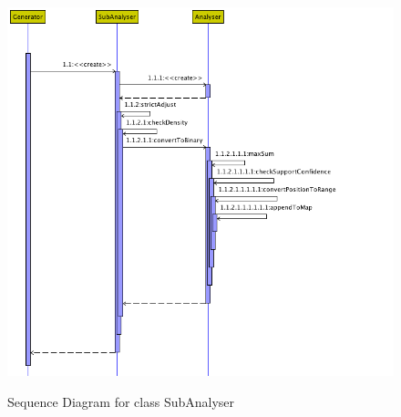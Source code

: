 \begin{description}
\begin{figure}[ht]
    \centering
    \includegraphics[width=5in, height=4.5in]{figures/sequence_subanalyser}
    \caption[Sequence Diagram for class SubAnalyser]{Sequence Diagram for class SubAnalyser}
    \label{fig:figure4_52}
\end{figure}

\end{description}


